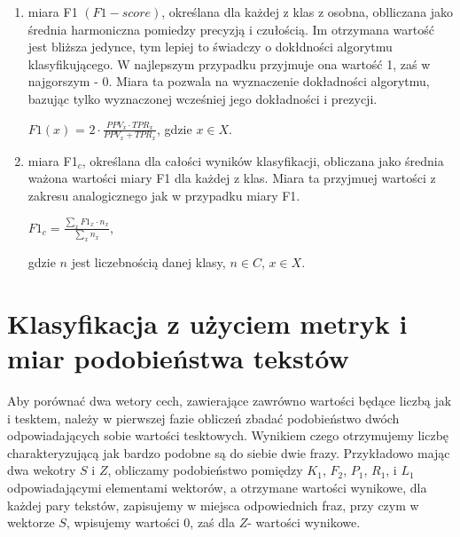 \documentclass{classrep}
\begin{document}
\begin{enumerate}
\item miara F1 \((F1-score)\), określana dla każdej z klas z osobna, oblliczana jako średnia harmoniczna pomiedzy precyzją i czułością.
Im otrzymana wartość jest bliższa jedynce, tym lepiej to świadczy o dokłdności algorytmu klasyfikującego. W najlepszym przypadku przyjmuje ona wartość 1, zaś w najgorszym - 0.
Miara ta pozwala na wyznaczenie dokładności algorytmu, bazując tylko wyznaczonej wcześniej jego dokładności i prezycji.\\
\begin{center}
    $F1(x)$ = $2 \cdot \frac{PPV_{x} \cdot TPR_{x}} {PPV_{x} + TPR_{x}}$, gdzie $x\in X$.\\
  \end{center} \hfill \break

\item miara F1$_c$, określana dla całości wyników klasyfikacji, obliczana jako średnia ważona wartości miary F1 dla każdej z klas. Miara ta przyjmuej wartości z zakresu analogicznego jak w przypadku miary F1. \\
\begin{center}
    $F1_c = \frac{\sum_{x} F1_x \cdot n_{x}}{\sum_{x} n_{x}}$, \\
  \end{center}
  gdzie $n$ jest liczebnością danej klasy, $n\in C$, $x\in X$.
\end{enumerate}



\section{Klasyfikacja z użyciem metryk i miar podobieństwa tekstów}

Aby porównać dwa wetory cech, zawierające zawrówno wartości będące liczbą jak i tesktem, należy w pierwszej fazie obliczeń zbadać podobieństwo dwóch odpowiadających sobie
wartości tesktowych. Wynikiem czego otrzymujemy liczbę charakteryzującą jak bardzo podobne są do siebie dwie frazy. Przykładowo mając dwa wekotry \(S\) i \(Z\), obliczamy
podobieństwo pomiędzy $K_1$, $F_2$, $P_1$, $R_1$, i $L_1$ odpowiadającymi elementami wektorów, a otrzymane wartości wynikowe, dla każdej pary tekstów, zapisujemy w miejsca odpowiednich fraz, przy czym
w wektorze \(S\), wpisujemy wartości 0, zaś dla \(Z\)- wartości wynikowe.
\end{document}
